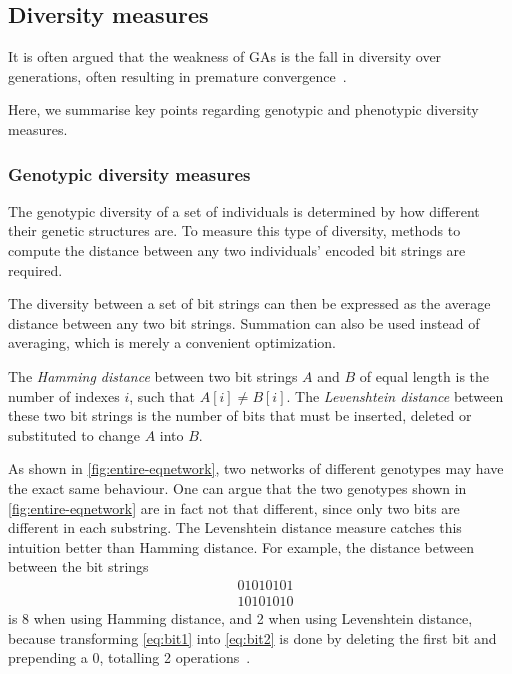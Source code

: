 \subsection{Diversity measures}
\label{sec:diversitymeasures}
It is often argued that the weakness of GAs is the fall in diversity over generations, often resulting in premature convergence~\cite{diaz2007empirical, 1266373,Zitzler00comparisonof}.

Here, we summarise key points regarding genotypic and phenotypic diversity measures. %

\subsubsection{Genotypic diversity measures}
The genotypic diversity of a set of individuals is determined by how different their genetic structures are. To measure this type of diversity, methods to compute the distance between any two individuals' encoded bit strings are required.

The diversity between a set of bit strings can then be expressed as the average distance between any two bit strings. Summation can also be used instead of averaging, which is merely a convenient optimization.

The \emph{Hamming distance} between two bit strings $A$ and $B$ of equal length is the number of indexes $i$, such that $A[i] \neq B[i]$. The \emph{Levenshtein distance} between these two bit strings is the number of bits that must be inserted, deleted or substituted to change $A$ into $B$.

As shown in \cref{fig:entire-eqnetwork}, two networks of different genotypes may have the exact same behaviour. One can argue that the two genotypes shown in \cref{fig:entire-eqnetwork} are in fact not that different, since only two bits are different in each substring. The Levenshtein distance measure catches this intuition better than Hamming distance. For example, the distance between between the bit strings
%
\begin{align}
  &01010101\label{eq:bit1} \\
  &10101010\label{eq:bit2}
\end{align}
%
is 8 when using Hamming distance, and 2 when using Levenshtein distance, because transforming \cref{eq:bit1} into \cref{eq:bit2} is done by deleting the first bit and prepending a $0$, totalling 2 operations~\cite{1250187}.

